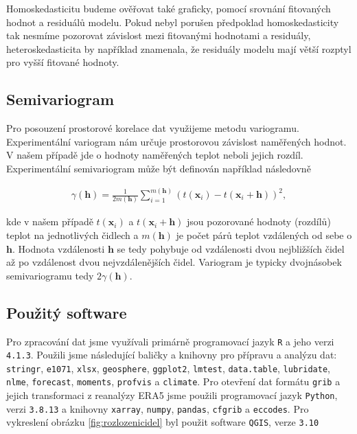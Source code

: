 Homoskedasticitu budeme ověřovat také graficky, pomocí srovnání fitovaných hodnot a residuálů modelu. Pokud nebyl porušen předpoklad homoskedasticity tak nesmíme pozorovat závislost mezi fitovanými hodnotami a residuály, heteroskedasticita by například znamenala, že residuály modelu mají větší rozptyl pro vyšší fitované hodnoty\cite{homoscedasticity}.

\subsection{Semivariogram}\label{chap:variogram}
Pro posouzení prostorové korelace dat využijeme metodu variogramu. Experimentální variogram nám určuje prostorovou závislost naměřených hodnot. V našem případě jde o hodnoty naměřených teplot neboli jejich rozdíl. Experimentální semivariogram může být definován například následovně

\begin{gather*}
	\gamma(\mathbf{h}) = \frac{1}{2m(\mathbf{h})}\sum_{i=1}^{m(\mathbf{h})}\left(t(\mathbf{x}_i) - t(\mathbf{x}_i+\mathbf{h})\right)^2,
\end{gather*}

kde v našem případě $t(\mathbf{x}_i)$ a $t(\mathbf{x}_i+\mathbf{h})$ jsou pozorované hodnoty (rozdílů) teplot na jednotlivých čidlech a $m(\mathbf{h})$ je počet párů teplot vzdálených od sebe o $\mathbf{h}$. Hodnota vzdálenosti $\mathbf{h}$ se tedy pohybuje od vzdálenosti dvou nejbližších čidel až po vzdálenost dvou nejvzdálenějších čidel. Variogram je typicky dvojnásobek semivariogramu tedy $2\gamma(\mathbf{h})$\cite{variogram}.

\subsection{Použitý software}
Pro zpracování dat jsme využívali primárně programovací jazyk \texttt{R}\cite{Rlanguage} a jeho verzi \texttt{4.1.3}. Použili jsme následující baličky a knihovny pro přípravu a analýzu dat: \texttt{stringr}\cite{stringr}, \texttt{e1071}\cite{e1071}, \texttt{xlsx}\cite{xlsx}, \texttt{geosphere}\cite{geosphere}, \texttt{ggplot2}\cite{ggplot2}, \texttt{lmtest}\cite{lmtest}, \texttt{data.table}\cite{data.table}, \texttt{lubridate}\cite{lubridate}, \texttt{nlme}\cite{nlme}, \texttt{forecast}\cite{forecast}, \texttt{moments}\cite{moments}, \texttt{profvis}\cite{profvis} a \texttt{climate}\cite{climate}. Pro otevření dat formátu \texttt{grib} a jejich transformaci z reanalýzy ERA5 jsme použili programovací jazyk \texttt{Python}, verzi \texttt{3.8.13}\cite{Python} a knihovny \texttt{xarray}\cite{xarray}, \texttt{numpy}\cite{numpy}, \texttt{pandas}\cite{pandas}, \texttt{cfgrib}\cite{cfgrib} a \texttt{eccodes}\cite{eccodes}. Pro vykreslení obrázku \ref{fig:rozlozenicidel} byl použit software \texttt{QGIS}, verze \texttt{3.10}\cite{qgis}

